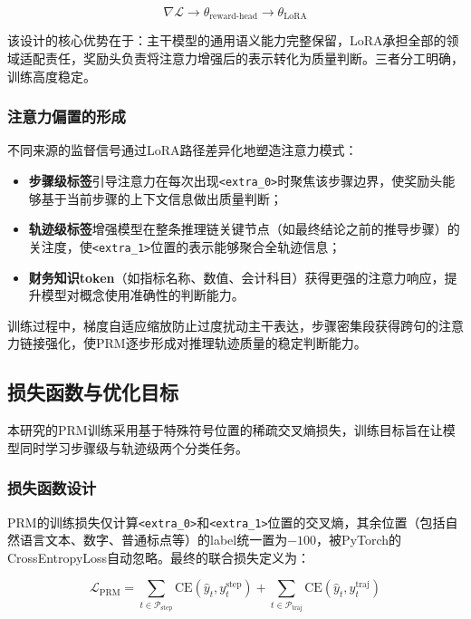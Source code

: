 \documentclass[professional,privacy,print,win,long,STEM,AutoFakeBold]{def/buaa}
\begin{document}
\[
\nabla \mathcal{L} \rightarrow \theta_{\text{reward-head}} \rightarrow \theta_{\text{LoRA}}
\]

该设计的核心优势在于：主干模型的通用语义能力完整保留，LoRA承担全部的领域适配责任，奖励头负责将注意力增强后的表示转化为质量判断。三者分工明确，训练高度稳定。

\subsubsection{注意力偏置的形成}

不同来源的监督信号通过LoRA路径差异化地塑造注意力模式：

\begin{itemize}
    \item \textbf{步骤级标签}引导注意力在每次出现\texttt{<extra\_0>}时聚焦该步骤边界，使奖励头能够基于当前步骤的上下文信息做出质量判断；
    \item \textbf{轨迹级标签}增强模型在整条推理链关键节点（如最终结论之前的推导步骤）的关注度，使\texttt{<extra\_1>}位置的表示能够聚合全轨迹信息；
    \item \textbf{财务知识token}（如指标名称、数值、会计科目）获得更强的注意力响应，提升模型对概念使用准确性的判断能力。
\end{itemize}

训练过程中，梯度自适应缩放防止过度扰动主干表达，步骤密集段获得跨句的注意力链接强化，使PRM逐步形成对推理轨迹质量的稳定判断能力。

\subsection{损失函数与优化目标}

本研究的PRM训练采用基于特殊符号位置的稀疏交叉熵损失，训练目标旨在让模型同时学习步骤级与轨迹级两个分类任务。

\subsubsection{损失函数设计}

PRM的训练损失仅计算\texttt{<extra\_0>}和\texttt{<extra\_1>}位置的交叉熵，其余位置（包括自然语言文本、数字、普通标点等）的label统一置为$-100$，被PyTorch的CrossEntropyLoss自动忽略。最终的联合损失定义为：

\[
\mathcal{L}_{\text{PRM}} = \sum_{t \in \mathcal{P}_{\text{step}}} \text{CE}(\hat{y}_t, y_t^{\text{step}}) + \sum_{t \in \mathcal{P}_{\text{traj}}} \text{CE}(\hat{y}_t, y_t^{\text{traj}})
\]
\end{document}
